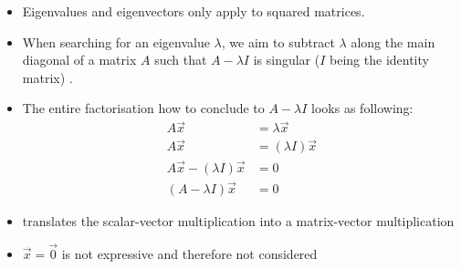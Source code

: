 \begin{itemize}
	\item Eigenvalues and eigenvectors only apply to squared matrices.
	\item When searching for an eigenvalue $\lambda$, we aim to subtract $\lambda$ along the main diagonal of a matrix $A$ such that $A - \lambda I$ is \gls{singular} ($I$ being the identity matrix) \cite{Strang2005tn}.
	\item The entire factorisation how to conclude to $A - \lambda I$ looks as following:
	\begin{align}
		\label{formula:eigenONE}
		A \overrightarrow{x} &= \lambda \overrightarrow{x} 
		\\
		\label{formula:eigenTWO}
		A \overrightarrow{x} &= (\lambda I) \overrightarrow{x}
		\\
		\label{formula:eigenTHREE}
		A \overrightarrow{x} - (\lambda I) \overrightarrow{x} &= 0
		\\
		\label{formula:eigenFOUR}
		(A - \lambda  I) \overrightarrow{x} &= 0
	\end{align}
	\item {} translates the scalar-vector multiplication into a matrix-vector multiplication
	\item $\overrightarrow{x} = \overrightarrow{0}$ is not expressive and therefore not considered
\end{itemize}




